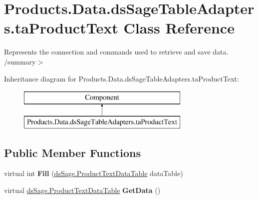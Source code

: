 \hypertarget{class_products_1_1_data_1_1ds_sage_table_adapters_1_1ta_product_text}{}\section{Products.\+Data.\+ds\+Sage\+Table\+Adapters.\+ta\+Product\+Text Class Reference}
\label{class_products_1_1_data_1_1ds_sage_table_adapters_1_1ta_product_text}


Represents the connection and commands used to retrieve and save data. /summary$>$  


Inheritance diagram for Products.\+Data.\+ds\+Sage\+Table\+Adapters.\+ta\+Product\+Text\+:\begin{figure}[H]
\begin{center}
\leavevmode
\includegraphics[height=2.000000cm]{class_products_1_1_data_1_1ds_sage_table_adapters_1_1ta_product_text}
\end{center}
\end{figure}
\subsection*{Public Member Functions}
\begin{DoxyCompactItemize}
\item 
virtual int {\bfseries Fill} (\hyperlink{class_products_1_1_data_1_1ds_sage_1_1_product_text_data_table}{ds\+Sage.\+Product\+Text\+Data\+Table} data\+Table)\hypertarget{class_products_1_1_data_1_1ds_sage_table_adapters_1_1ta_product_text_acd17576fce47ede312f65f541f366267}{}\label{class_products_1_1_data_1_1ds_sage_table_adapters_1_1ta_product_text_acd17576fce47ede312f65f541f366267}

\item 
virtual \hyperlink{class_products_1_1_data_1_1ds_sage_1_1_product_text_data_table}{ds\+Sage.\+Product\+Text\+Data\+Table} {\bfseries Get\+Data} ()\hypertarget{class_products_1_1_data_1_1ds_sage_table_adapters_1_1ta_product_text_a97f152239e39e4d453c17703b33b4aaa}{}\label{class_products_1_1_data_1_1ds_sage_table_adapters_1_1ta_product_text_a97f152239e39e4d453c17703b33b4aaa}

\end{DoxyCompactItemize}
